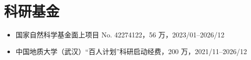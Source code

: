 \section{科研基金}

\begin{itemize}
\item 国家自然科学基金面上项目 No. 42274122，56 万，2023/01--2026/12
\item 中国地质大学（武汉）“百人计划”科研启动经费，200 万，2021/11--2026/12
\end{itemize}
